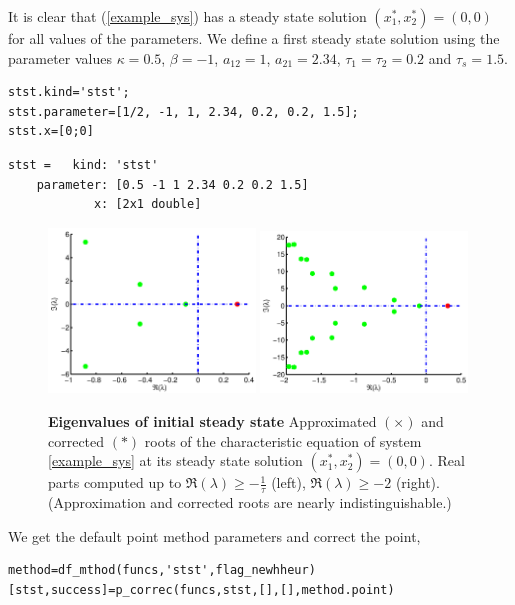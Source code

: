 \documentclass[10pt]{scrartcl}
\begin{document}
It is clear that
(\ref{example_sys}) has a steady state solution $(x_1^*,x_2^*)=(0,0)$
for all values of the parameters.  We define a first steady state
solution using the parameter values $\kappa=0.5$, $\beta=-1$,
$a_{12}=1$, $a_{21}=2.34$, $\tau_1=\tau_2=0.2$ and $\tau_s=1.5$.
\begin{lstlisting}
stst.kind='stst';
stst.parameter=[1/2, -1, 1, 2.34, 0.2, 0.2, 1.5];
stst.x=[0;0]  
\end{lstlisting}
{\small
\begin{verbatim}
stst =   kind: 'stst'
    parameter: [0.5 -1 1 2.34 0.2 0.2 1.5]
            x: [2x1 double]
\end{verbatim}
}
\begin{figure}[htbp]
  \begin{center}
    \includegraphics[width=0.49\textwidth]{fig/demo1fig01}%
    \includegraphics[width=0.49\textwidth]{fig/demo1fig02}
  \end{center}
  \caption{\label{ride1+2_pic}\textbf{\textsf{Eigenvalues of initial
        steady state}} Approximated $(\times)$ and corrected $(*)$
    roots of the characteristic equation of system \eqref{example_sys}
    at its steady state solution $(x_1^*,x_2^*)=(0,0)$.  Real parts
    computed up to $\Re(\lambda)\geq -\frac{1}{\tau}$ (left),
    $\Re(\lambda)\geq -2$ (right). (Approximation and corrected roots
    are nearly indistinguishable.)}
\end{figure}
We get the default point method parameters and 
correct the point,
\begin{lstlisting}
method=df_mthod(funcs,'stst',flag_newhheur)
[stst,success]=p_correc(funcs,stst,[],[],method.point)
\end{lstlisting}
\end{document}
